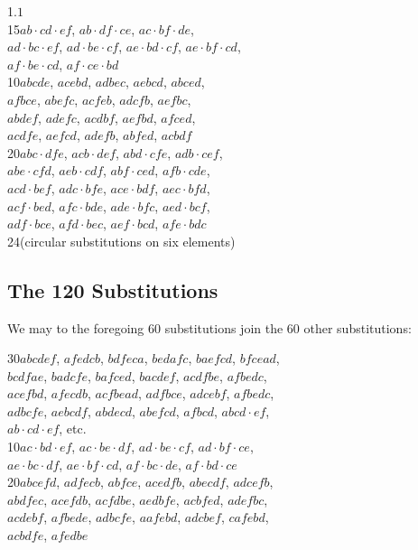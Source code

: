 \documentclass[11pt,a4paper]{book}
\begin{document}
1.\quad $1$ \\
15\quad $ab \cdot cd \cdot ef$, $ab \cdot df \cdot ce$, $ac \cdot bf \cdot de$, \\
\phantom{15\quad} $ad \cdot bc \cdot ef$, $ad \cdot be \cdot cf$, $ae \cdot bd \cdot cf$, $ae \cdot bf \cdot cd$, \\
\phantom{15\quad} $af \cdot be \cdot cd$, $af \cdot ce \cdot bd$ \\
10\quad $abcde$, $acebd$, $adbec$, $aebcd$, $abced$, \\
\phantom{10\quad} $afbce$, $abefc$, $acfeb$, $adcfb$, $aefbc$, \\
\phantom{10\quad} $abdef$, $adefc$, $acdbf$, $aefbd$, $afced$, \\
\phantom{10\quad} $acdfe$, $aefcd$, $adefb$, $abfed$, $acbd f$ \\
20\quad $abc \cdot dfe$, $acb \cdot def$, $abd \cdot cfe$, $adb \cdot cef$, \\
\phantom{20\quad} $abe \cdot cfd$, $aeb \cdot cdf$, $abf \cdot ced$, $afb \cdot cde$, \\
\phantom{20\quad} $acd \cdot bef$, $adc \cdot bfe$, $ace \cdot bdf$, $aec \cdot bfd$, \\
\phantom{20\quad} $acf \cdot bed$, $afc \cdot bde$, $ade \cdot bfc$, $aed \cdot bcf$, \\
\phantom{20\quad} $adf \cdot bce$, $afd \cdot bec$, $aef \cdot bcd$, $afe \cdot bdc$ \\
24\quad (circular substitutions on six elements)

\subsection*{The 120 Substitutions}

We may to the foregoing 60 substitutions join the 60 other substitutions:

30\quad $abcdef$, $afedcb$, $bdfeca$, $bedafc$, $baefcd$, $bfcead$, \\
\phantom{30\quad} $bcdfae$, $badcfe$, $bafced$, $bacdef$, $acdfbe$, $afbedc$, \\
\phantom{30\quad} $acefbd$, $afecdb$, $acfbead$, $adfbce$, $adcebf$, $afbedc$, \\
\phantom{30\quad} $adbcfe$, $aebcdf$, $abdecd$, $abefcd$, $afbcd$, $abcd \cdot ef$, \\
\phantom{30\quad} $ab \cdot cd \cdot ef$, etc. \\
10\quad $ac \cdot bd \cdot ef$, $ac \cdot be \cdot df$, $ad \cdot be \cdot cf$, $ad \cdot bf \cdot ce$, \\
\phantom{10\quad} $ae \cdot bc \cdot df$, $ae \cdot bf \cdot cd$, $af \cdot bc \cdot de$, $af \cdot bd \cdot ce$ \\
20\quad $abcefd$, $adfecb$, $abfce$, $acedfb$, $abecdf$, $adcefb$, \\
\phantom{20\quad} $abdfec$, $acefdb$, $acfdbe$, $aedbfe$, $acbfed$, $adefbc$, \\
\phantom{20\quad} $acdebf$, $afbede$, $adbcfe$, $aafebd$, $adcbef$, $cafebd$, \\
\phantom{20\quad} $acbdfe$, $afedbe$ \\
\end{document}
